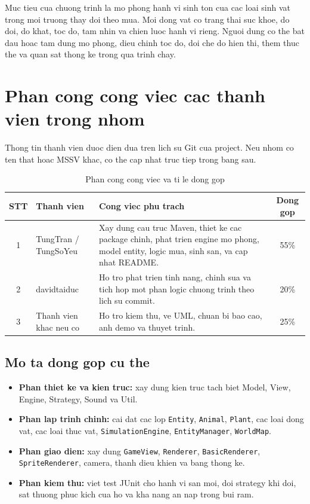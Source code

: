 \documentclass[12pt,a4paper]{article}
\begin{document}
Muc tieu cua chuong trinh la mo phong hanh vi sinh ton cua cac loai sinh vat trong moi truong thay doi theo mua. Moi dong vat co trang thai suc khoe, do doi, do khat, toc do, tam nhin va chien luoc hanh vi rieng. Nguoi dung co the bat dau hoac tam dung mo phong, dieu chinh toc do, doi che do hien thi, them thuc the va quan sat thong ke trong qua trinh chay.

\section{Phan cong cong viec cac thanh vien trong nhom}

Thong tin thanh vien duoc dien dua tren lich su Git cua project. Neu nhom co ten that hoac MSSV khac, co the cap nhat truc tiep trong bang sau.

\begin{table}[H]
    \centering
    \caption{Phan cong cong viec va ti le dong gop}
    \begin{tabular}{|c|p{4cm}|p{7cm}|c|}
        \hline
        \textbf{STT} & \textbf{Thanh vien} & \textbf{Cong viec phu trach} & \textbf{Dong gop} \\
        \hline
        1 & TungTran / TungSoYeu
        & Xay dung cau truc Maven, thiet ke cac package chinh, phat trien engine mo phong, model entity, logic mua, sinh san, va cap nhat README.
        & 55\% \\
        \hline
        2 & davidtaiduc
        & Ho tro phat trien tinh nang, chinh sua va tich hop mot phan logic chuong trinh theo lich su commit.
        & 20\% \\
        \hline
        3 & Thanh vien khac neu co
        & Ho tro kiem thu, ve UML, chuan bi bao cao, anh demo va thuyet trinh.
        & 25\% \\
        \hline
    \end{tabular}
\end{table}

\subsection{Mo ta dong gop cu the}

\begin{itemize}
    \item \textbf{Phan thiet ke va kien truc:} xay dung kien truc tach biet Model, View, Engine, Strategy, Sound va Util.
    \item \textbf{Phan lap trinh chinh:} cai dat cac lop \texttt{Entity}, \texttt{Animal}, \texttt{Plant}, cac loai dong vat, cac loai thuc vat, \texttt{SimulationEngine}, \texttt{EntityManager}, \texttt{WorldMap}.
    \item \textbf{Phan giao dien:} xay dung \texttt{GameView}, \texttt{Renderer}, \texttt{BasicRenderer}, \texttt{SpriteRenderer}, camera, thanh dieu khien va bang thong ke.
    \item \textbf{Phan kiem thu:} viet test JUnit cho hanh vi san moi, doi strategy khi doi, sat thuong phuc kich cua ho va kha nang an nap trong bui ram.
\end{itemize}
\end{document}
